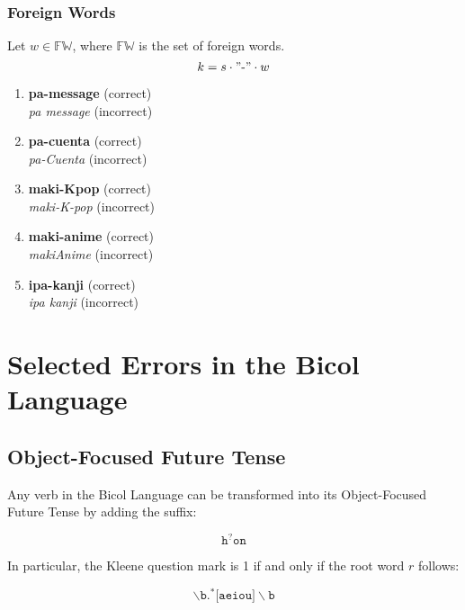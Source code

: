 \subsubsection{Foreign Words}
Let \(w \in \mathbb{FW}\), where \(\mathbb{FW}\) is the set of foreign words.
\[
      k = s \cdot "\text{-}" \cdot w
\]
\begin{example}
\end{example}
\begin{enumerate}
      \item \textbf{pa-message} (correct) \\
            \textit{pa message} (incorrect)
      \item \textbf{pa-cuenta} (correct) \\
            \textit{pa-Cuenta} (incorrect)
      \item \textbf{maki-Kpop} (correct) \\
            \textit{maki-K-pop} (incorrect)
      \item \textbf{maki-anime} (correct) \\
            \textit{makiAnime} (incorrect)
      \item \textbf{ipa-kanji} (correct) \\
            \textit{ipa kanji} (incorrect)
\end{enumerate}

\section{Selected Errors in the Bicol Language}
\subsection{Object-Focused Future Tense}
Any verb in the Bicol Language can be transformed into its Object-Focused Future Tense by adding the suffix:

\[
      \texttt{h}^?\texttt{on}
\]

In particular, the Kleene question mark is 1 if and only if the root word $r$ follows:

\[
      \backslash\texttt{b.}^*\texttt{[aeiou]}\backslash\texttt{b}
\]

\begin{example}
\end{example}

